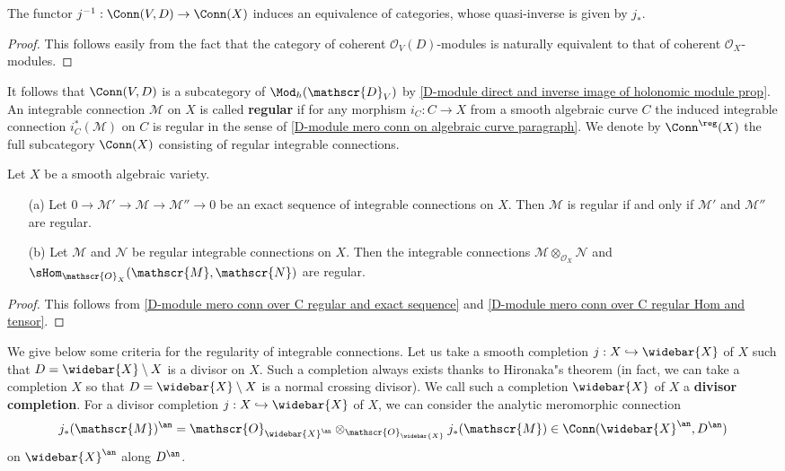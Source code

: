\begin{lemma}\label{D-module algebraic mero conn equivalence of cat}
The functor $j^{-1}:\Conn(V,D)\to\Conn(X)$ induces an equivalence of categories, whose quasi-inverse is given by $j_*$.
\end{lemma}
\begin{proof}
This follows easily from the fact that the category of coherent $\mathscr{O}_V(D)$-modules is naturally equivalent to that of coherent $\mathscr{O}_X$-modules.
\end{proof}
It follows that $\Conn(V,D)$ is a subcategory of $\Mod_h(\mathscr{D}_V)$ by \cref{D-module direct and inverse image of holonomic module prop}. An integrable connection $\mathscr{M}$ on $X$ is called \textbf{regular} if for any morphism $i_C:C\to X$ from a smooth algebraic curve $C$ the induced integrable connection $i^*_C(\mathscr{M})$ on $C$ is regular in the sense of \ref{D-module mero conn on algebraic curve paragraph}. We denote by $\Conn^{\reg}(X)$ the full subcategory $\Conn(X)$ consisting of regular integrable connections.

\begin{proposition}\label{D-module algebraic mero conn regular prop}
Let $X$ be a smooth algebraic variety.
\begin{enumerate}
    \item[(a)] Let $0\to\mathscr{M}'\to\mathscr{M}\to\mathscr{M}''\to 0$ be an exact sequence of integrable connections on $X$. Then $\mathscr{M}$ is regular if and only if $\mathscr{M}'$ and $\mathscr{M}''$ are regular.
    \item[(b)] Let $\mathscr{M}$ and $\mathscr{N}$ be regular integrable connections on $X$. Then the integrable connections $\mathscr{M}\otimes_{\mathscr{O}_X}\mathscr{N}$ and $\sHom_{\mathscr{O}_X}(\mathscr{M},\mathscr{N})$ are regular. 
\end{enumerate}

\end{proposition}
\begin{proof}
This follows from \cref{D-module mero conn over C regular and exact sequence} and \cref{D-module mero conn over C regular Hom and tensor}.
\end{proof}

We give below some criteria for the regularity of integrable connections. Let us take a smooth completion $j:X\hookrightarrow\widebar{X}$ of $X$ such that $D=\widebar{X}\setminus X$ is a divisor on $X$. Such a completion always exists thanks to Hironaka"s theorem (in fact, we can take a completion $X$ so that $D=\widebar{X}\setminus X$ is a normal crossing divisor). We call such a completion $\widebar{X}$ of $X$ a \textbf{divisor completion}. For a divisor completion $j:X\hookrightarrow\widebar{X}$ of $X$, we can consider the analytic meromorphic connection
\[j_*(\mathscr{M})^{\an}=\mathscr{O}_{\widebar{X}^{\an}}\otimes_{\mathscr{O}_{\widebar{X}}}j_*(\mathscr{M})\in\Conn(\widebar{X}^{\an},D^{\an})\]
on $\widebar{X}^{\an}$ along $D^{\an}$.

